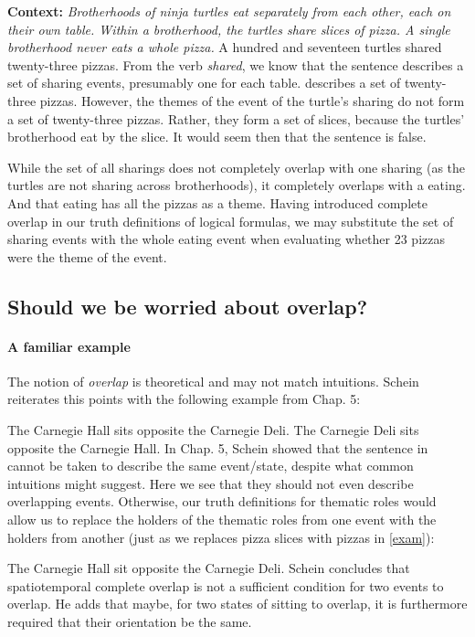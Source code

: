 \pex
\a 
\textbf{Context:}
\emph{
Brotherhoods of ninja turtles eat separately from each other, each on their own table. 
Within a brotherhood, the turtles share slices of pizza.
A single brotherhood never eats a whole pizza.
}
\a \label{exam}
A hundred and seventeen turtles shared twenty-three pizzas.
\xe
%
From the verb \emph{shared}, we know that the sentence describes a set of sharing events, presumably one for each table.   describes a set of twenty-three pizzas. However, the themes of the event of the turtle's sharing do not form a set of twenty-three pizzas. Rather, they form a set of slices, because the turtles' brotherhood eat by the slice. It would seem then that the sentence is false.

While the set of all sharings does not completely overlap with one sharing (as the turtles are not sharing across brotherhoods), it completely overlaps with a eating. And that eating has all the pizzas as a theme. Having introduced complete overlap in our truth definitions of logical formulas, we may substitute the set of sharing events with the whole eating event when evaluating whether 23 pizzas were the theme of the event.

\subsection{Should we be worried about overlap?}

\paragraph{A familiar example}
The notion of \emph{overlap} is theoretical and may not match intuitions. Schein reiterates this points with the following example from Chap. 5:

\pex
\a The Carnegie Hall sits opposite the Carnegie Deli.
\a The Carnegie Deli sits opposite the Carnegie Hall.
\xe
%
In Chap. 5, Schein showed that the sentence in \clastx cannot be taken to describe the same event/state, despite what common intuitions might suggest. Here we see that they should not even describe overlapping events. Otherwise, our truth definitions for thematic roles would allow us to replace the holders of the thematic roles from one event with the holders from another (just as we replaces pizza slices with pizzas in \cref{exam}):

\ex
The Carnegie Hall sit opposite the Carnegie Deli.
\xe
%
Schein concludes that spatiotemporal complete overlap is not a sufficient condition for two events to overlap. He adds that maybe, for two states of sitting to overlap, it is furthermore required that their orientation be the same.

